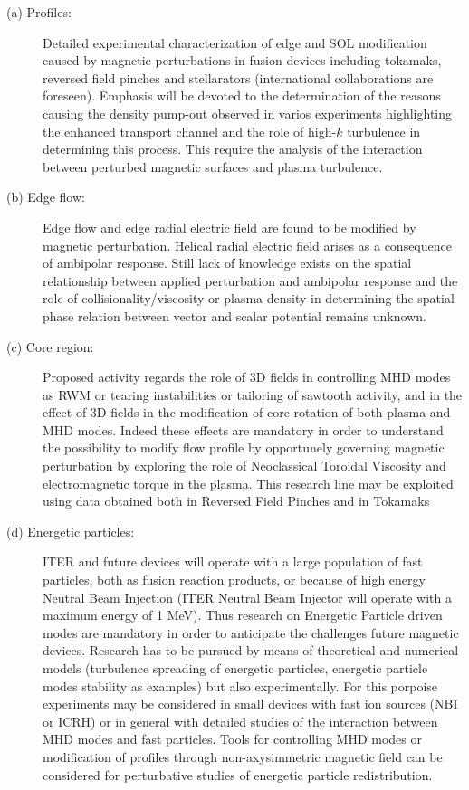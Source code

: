 \documentclass[12pt,a4paper]{article}
\begin{document}
\begin{description}
\item[(a) Profiles: ] Detailed experimental characterization of
  edge and SOL modification caused by magnetic perturbations in fusion
  devices including tokamaks, reversed field pinches and
  stellarators (international collaborations are foreseen). Emphasis will
  be devoted to the determination of the reasons causing the
  density pump-out observed in varios experiments highlighting the
  enhanced transport channel and the role of high-$k$ turbulence in
  determining this process. This require the analysis of the interaction
  between perturbed magnetic surfaces and plasma turbulence.
\item[(b) Edge flow:] Edge flow and edge radial electric field are 
  found to be modified by magnetic perturbation. Helical radial
  electric field arises as a consequence of ambipolar response. Still
  lack of knowledge exists on the spatial relationship between applied
  perturbation and ambipolar response and the role of
  collisionality/viscosity or plasma density in determining the spatial phase
  relation between vector and scalar potential remains unknown. 
\item[(c) Core region: ]Proposed activity regards the role of 3D fields
in controlling MHD modes 
as RWM or tearing instabilities or tailoring of sawtooth activity, and in the effect of 3D fields in the
modification of 
core rotation of both plasma and MHD modes. Indeed these effects are
mandatory in order to understand 
the possibility to modify flow profile by opportunely governing
magnetic perturbation by exploring 
the role of Neoclassical Toroidal Viscosity and electromagnetic torque
in the plasma. 
This research line may be exploited using data obtained both in Reversed Field Pinches and in Tokamaks
\item[(d) Energetic particles: ]ITER and future devices will operate with a large population of fast particles, 
both as fusion reaction products, or because of high energy Neutral
Beam Injection 
(ITER Neutral Beam Injector will operate with a maximum energy of 1
MeV). 
Thus research on Energetic Particle driven modes are mandatory in
order to anticipate the challenges future magnetic devices.
Research has to be pursued by means of theoretical and numerical
models (turbulence spreading of energetic particles, energetic
particle modes stability as examples) 
but also experimentally. 
For this porpoise experiments may be considered in small 
devices with fast ion sources (NBI or ICRH) or in general  with detailed studies of the interaction between MHD modes and fast
particles. Tools for controlling MHD modes or modification of profiles
through non-axysimmetric magnetic field can be considered for
perturbative studies of energetic particle redistribution.
  
\end{description}
\end{document}
